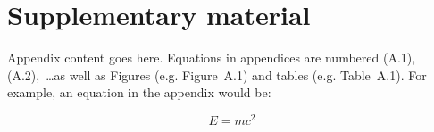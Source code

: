 \documentclass{wpom-upv}
\begin{document}

\appendix

\section{Supplementary material}

Appendix content goes here. Equations in appendices are numbered
(A.1), (A.2),~\ldots as well as Figures (e.g. Figure~A.1) and tables (e.g. Table~A.1). For example, an equation in the appendix would be:

\begin{equation}
    E = mc^2
\end{equation}
\end{document}
